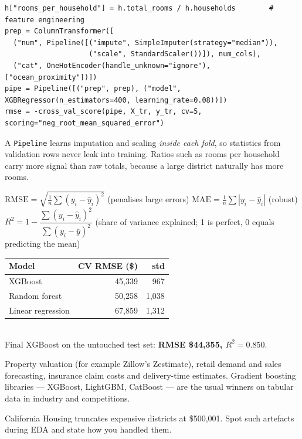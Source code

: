 \documentclass[11pt,a4paper]{article}
\begin{document}
\begin{bcode}
\begin{lstlisting}
h["rooms_per_household"] = h.total_rooms / h.households        # feature engineering
prep = ColumnTransformer([
  ("num", Pipeline([("impute", SimpleImputer(strategy="median")),
                    ("scale", StandardScaler())]), num_cols),
  ("cat", OneHotEncoder(handle_unknown="ignore"), ["ocean_proximity"])])
pipe = Pipeline([("prep", prep), ("model", XGBRegressor(n_estimators=400, learning_rate=0.08))])
rmse = -cross_val_score(pipe, X_tr, y_tr, cv=5, scoring="neg_root_mean_squared_error")
\end{lstlisting}
\end{bcode}
A \texttt{Pipeline} learns imputation and scaling \emph{inside each fold}, so statistics from validation rows never leak into training. Ratios such as rooms per household carry more signal than raw totals, because a large district naturally has more rooms.
\begin{bmath}
$\mathrm{RMSE}=\sqrt{\tfrac1n\sum(y_i-\hat y_i)^2}$ (penalises large errors) \qquad $\mathrm{MAE}=\tfrac1n\sum|y_i-\hat y_i|$ (robust)\\[2pt]
$R^2=1-\dfrac{\sum(y_i-\hat y_i)^2}{\sum(y_i-\bar y)^2}$ (share of variance explained; 1 is perfect, 0 equals predicting the mean)
\end{bmath}
\begin{bres}
\begin{tabular}{lrr}
\toprule
Model & CV RMSE (\$) & std\\
\midrule
XGBoost & 45,339 & 967\\
Random forest & 50,258 & 1,038\\
Linear regression & 67,859 & 1,312\\
\bottomrule
\end{tabular}\\[3pt]
Final XGBoost on the untouched test set: \textbf{RMSE \$44,355, $R^2=0.850$}.
\end{bres}
\begin{bapp}
Property valuation (for example Zillow's Zestimate), retail demand and sales forecasting, insurance claim costs and delivery-time estimates. Gradient boosting libraries --- XGBoost, LightGBM, CatBoost --- are the usual winners on tabular data in industry and competitions.
\end{bapp}
\begin{bwarn}
California Housing truncates expensive districts at \$500,001. Spot such artefacts during EDA and state how you handled them.
\end{bwarn}
\end{document}
